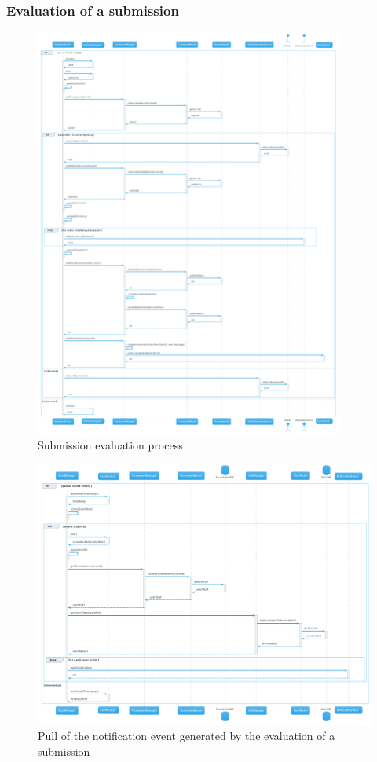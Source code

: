 \subsubsection{Evaluation of a submission}
\begin{figure}[H]
    \hspace{0.5cm}
    \includegraphics[width=0.9\textwidth]{Diagrams/sequence/evaluate_submission.png}
    \caption{Submission evaluation process}
\end{figure}
\begin{figure}[H]
    \hspace{-1.5cm}
    \includegraphics[width=1.2\textwidth]{Diagrams/sequence/evaluate_submission_pull_notification.png}
    \caption{Pull of the notification event generated by the evaluation of a submission}
\end{figure}

